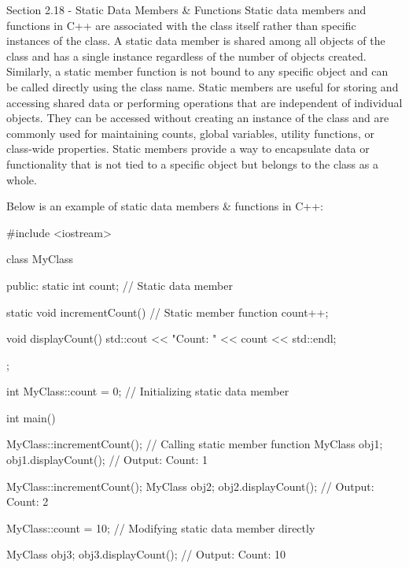\begin{notes}{Section 2.18 - Static Data Members \& Functions}
    Static data members and functions in C++ are associated with the class itself rather than specific instances of the class. A static data member is shared among all objects of the class and has a single instance regardless of the number of objects created. Similarly, a static member function is not bound to any specific object 
    and can be called directly using the class name. Static members are useful for storing and accessing shared data or performing operations that are independent of individual objects. They can be accessed without creating an instance of the class and are commonly used for maintaining counts, global variables, utility functions, 
    or class-wide properties. Static members provide a way to encapsulate data or functionality that is not tied to a specific object but belongs to the class as a whole.
    
    \begin{highlight}
        Below is an example of static data members \& functions in C++:
    \begin{code}[C++]
    #include <iostream>
    
    class MyClass {
    public:
        static int count;  // Static data member
    
        static void incrementCount() {  // Static member function
            count++;
        }
    
        void displayCount() {
            std::cout << "Count: " << count << std::endl;
        }
    };
    
    int MyClass::count = 0;  // Initializing static data member
    
    int main() {
        MyClass::incrementCount();  // Calling static member function
        MyClass obj1;
        obj1.displayCount();  // Output: Count: 1
    
        MyClass::incrementCount();
        MyClass obj2;
        obj2.displayCount();  // Output: Count: 2
    
        MyClass::count = 10;  // Modifying static data member directly
    
        MyClass obj3;
        obj3.displayCount();  // Output: Count: 10
    
}
\end{code}
\end{highlight}
\end{notes}
